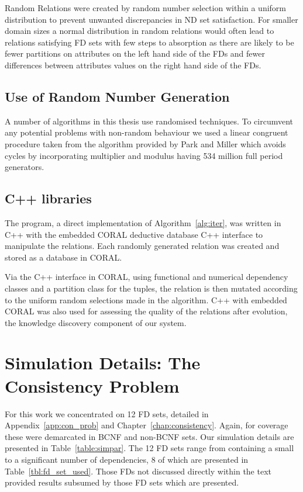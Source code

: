 \medskip

Random Relations were created by random number
selection within a uniform distribution to prevent unwanted
discrepancies in ND set satisfaction. For smaller domain sizes a
normal distribution in random relations would often lead to relations
satisfying FD sets with few steps to absorption as there are likely to
be fewer partitions on attributes on the left hand side of the FDs and
fewer differences between attributes values on the right hand side of the FDs.


\subsection{Use of Random Number Generation}\label{subsec:imp_note}

A number of algorithms in this thesis use randomised techniques. To
circumvent any potential problems with non-random behaviour we used
a linear congruent procedure taken
from the algorithm provided by Park and Miller \cite{pm88} which
avoids cycles by incorporating multiplier and modulus
having 534 million full period generators. 
 
\subsection{C++ libraries}

The program, a direct implementation of Algorithm~\ref{alg:iter},
 was written in C++ with the embedded CORAL deductive
database C++ interface to manipulate the relations. Each randomly
generated relation was created and stored as a database in CORAL.
\smallskip

Via the C++ interface in CORAL, using functional and numerical dependency
classes and a partition class for the tuples, the relation 
 is then mutated according
to the uniform random selections made in the algorithm. C++ with
embedded CORAL was also used for assessing the quality of
the relations after evolution, the knowledge discovery component
of our system.

\section{Simulation Details: The Consistency
Problem}\label{sec:sim_conprob}

For this work we concentrated on 12 FD sets, detailed in
Appendix~\ref{app:con_prob} and Chapter~\ref{chap:consistency}. Again,
for
coverage these were demarcated in BCNF and non-BCNF sets. Our
simulation details are presented in Table~\ref{table:simpar}. The 12
FD sets range from containing a small to a significant number of
dependencies, 8 of which are presented in
Table~\ref{tbl:fd_set_used}. Those FDs not discussed directly within
the text provided results subsumed by those FD sets which are
presented. 

